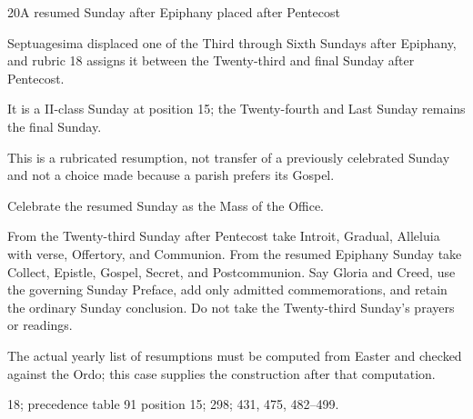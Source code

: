 \begin{casefile}{20}{A resumed Sunday after Epiphany placed after Pentecost}
\item[Calendar facts] Septuagesima displaced one of the Third through Sixth Sundays after Epiphany, and rubric 18 assigns it between the Twenty-third and final Sunday after Pentecost.
\item[Ranks and rows] It is a II-class Sunday at position 15; the Twenty-fourth and Last Sunday remains the final Sunday.
\item[Impeded item] This is a rubricated resumption, not transfer of a previously celebrated Sunday and not a choice made because a parish prefers its Gospel.
\item[Mass category] Celebrate the resumed Sunday as the Mass of the Office.
\item[Assembly] From the Twenty-third Sunday after Pentecost take Introit, Gradual, Alleluia with verse, Offertory, and Communion.  From the resumed Epiphany Sunday take Collect, Epistle, Gospel, Secret, and Postcommunion.  Say Gloria and Creed, use the governing Sunday Preface, add only admitted commemorations, and retain the ordinary Sunday conclusion.  Do not take the Twenty-third Sunday's prayers or readings.
\item[Boundary] The actual yearly list of resumptions must be computed from Easter and checked against the Ordo; this case supplies the construction after that computation.
\item[Rubric locus] 18; precedence table 91 position 15; 298; 431, 475, 482--499.
\end{casefile}

